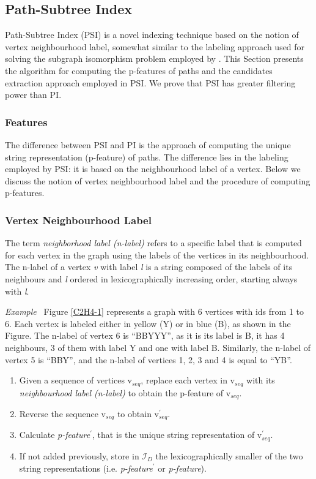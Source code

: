 \documentclass{l4proj}
\newcounter{example}[section]
\newenvironment{example}[1][]{\refstepcounter{example}\par\medskip
   \noindent \textit{Example~\theexample #1} \rmfamily}{\medskip}
\newcommand{\fancyI}{\mathcal{I}}
\begin{document}
\subsection{Path-Subtree Index}
\label{path-subtree-index}
Path-Subtree Index (PSI) is a novel indexing technique based on the notion of vertex neighbourhood label, somewhat similar to the labeling approach used for solving the subgraph isomorphism problem employed by \cite{Solnon:2010}. This Section presents the algorithm for computing the p-features of paths and the candidates extraction approach employed in PSI. We prove that PSI has greater filtering power than PI.

\subsubsection{Features}
The difference between PSI and PI is the approach of computing the unique string representation (p-feature) of paths. The difference lies in the labeling employed by PSI: it is based on the neighbourhood label of a vertex. Below we discuss the notion of vertex neighbourhood label and the procedure of computing p-features.

\subsubsection{Vertex Neighbourhood Label}

The term \emph{neighborhood label (n-label)} refers to a specific label that is computed for each vertex in the graph using the labels of the vertices in its neighbourhood. The n-label of a vertex \emph{v} with label \emph{l} is a string composed of the labels of its neighbours and \emph{l} ordered in lexicographically increasing order, starting always with \emph{l}.

\begin{example}
\label{ex:nlabel}
Figure \ref{C2H4-1} represents a graph with 6 vertices with ids from 1 to 6. Each vertex is labeled either in yellow (Y) or in blue (B), as shown in the Figure. The n-label of vertex 6 is ``BBYYY'', as it is its label is B, it has 4 neighbours, 3 of them with label Y and one with label B. Similarly, the n-label of vertex 5 is ``BBY'', and the n-label of vertices 1, 2, 3 and 4 is equal to ``YB''.
\end{example}

\begin{enumerate}
\item Given a sequence of vertices v$_{seq}$, replace each vertex in v$_{seq}$ with its \emph{neighbourhood label (n-label)} to obtain the p-feature of v$_{seq}$.
\item Reverse the sequence v$_{seq}$ to obtain v$_{seq}^{\prime}$.
\item Calculate \emph{p-feature}$^{\prime}$, that is the unique string representation of v$_{seq}^{\prime}$.
\item If not added previously, store in $\fancyI_{D}$ the lexicographically smaller of the two string representations (i.e. \emph{p-feature}$^{\prime}$ or \emph{p-feature}).
\end{enumerate}
\end{document}
